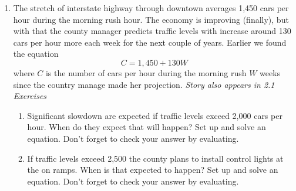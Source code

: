 \begin{enumerate}
\item The stretch of interstate highway through downtown averages 1,450 cars per hour during the morning rush hour.  The economy is improving (finally), but with that the county manager predicts traffic levels with increase around 130 cars per hour more each week for the next couple of years. Earlier we found the equation $$C=1,450 + 130W$$ where $C$ is the number of cars per hour during the morning rush $W$ weeks since the country manage made her projection.   \hfill \emph{Story also appears in 2.1 Exercises}
\begin{enumerate}
\item Significant slowdown are expected if traffic levels exceed 2,000 cars per hour.  When do they expect that will happen? Set up and solve an equation.  Don't forget to check your answer by evaluating.
\item If traffic levels exceed 2,500 the county plans to install control lights at the on ramps.  When is that expected to happen?   Set up and solve an equation.  Don't forget to check your answer by evaluating.
\end{enumerate} 


\end{enumerate}
